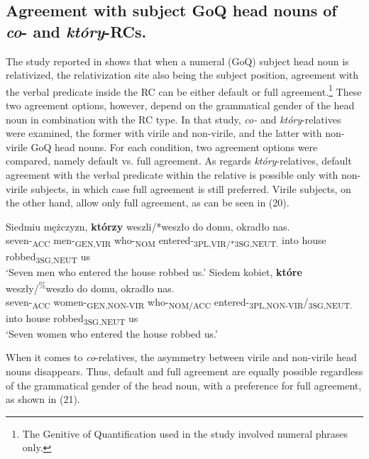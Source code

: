 \documentclass[output=paper]{langsci/langscibook}
\begin{document}
\subsection{Agreement with subject GoQ head nouns of \textit{co}{}- and \textit{który}{}-RCs.}%
The study reported in \citet{Łęska2016} shows that when a numeral (GoQ) subject head noun is relativized, the relativization site also being the subject position, agreement with the verbal predicate inside the RC can be either default or full agreement.\footnote{The Genitive of Quantification used in the study involved numeral phrases only.} These two agreement options, however, depend on the grammatical gender of the head noun in combination with the RC type. In that study, \textit{co-} and \textit{który}{}-relatives were examined, the former with virile and non-virile, and the latter with non-virile GoQ head nouns. For each condition, two agreement options were compared, namely default vs. full agreement. As regards \textit{który}{}-relatives, default agreement with the verbal predicate within the relative is possible only with non-virile subjects, in which case full agreement is still preferred. Virile subjects, on the other hand, allow only full agreement, as can be seen in (20).

\ea%
    \label{ex:leska:20}
    \ea
    \gll Siedmiu   mężczyzn,  \textbf{którzy}   weszli/*weszło  do   domu,   okradło     nas.        \\
          seven-\textsubscript{ACC}   men-\textsubscript{GEN,VIR}   who-\textsubscript{NOM}  entered-\textsubscript{3PL,VIR/*3SG,NEUT.}       into  house     robbed\textsubscript{3SG,NEUT}   us   \\
    \glt ‘Seven men who entered the house robbed us.’
    \ex
    \gll  Siedem   kobiet,     \textbf{które}   weszły/\textsuperscript{\%}weszło       do   domu,   okradło     nas.  \\
           seven-\textsubscript{ACC}   women-\textsubscript{GEN,NON-VIR} who-\textsubscript{NOM/ACC}  entered-\textsubscript{3PL,NON-VIR}/\textsubscript{3SG,NEUT.}  into   house     robbed\textsubscript{3SG,NEUT}   us\\
    \glt  ‘Seven women who entered the house robbed us.’
    \z
\z    

When it comes to \textit{co}{}-relatives, the asymmetry between virile and non-virile head nouns disappears. Thus, default and full agreement are equally possible regardless of the grammatical gender of the head noun, with a preference for full agreement, as shown in (21).
 
\end{document}
